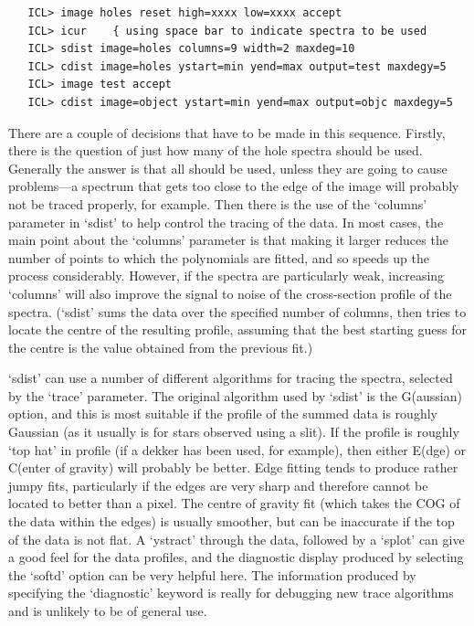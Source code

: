 \documentclass[11pt,twoside]{article}
\newcommand{\latorhtm}[2]{#1}
\newcommand{\latorhtm}[2]{#2}
\begin{document}
\begin{verbatim}
   ICL> image holes reset high=xxxx low=xxxx accept
   ICL> icur    { using space bar to indicate spectra to be used
   ICL> sdist image=holes columns=9 width=2 maxdeg=10
   ICL> cdist image=holes ystart=min yend=max output=test maxdegy=5
   ICL> image test accept
   ICL> cdist image=object ystart=min yend=max output=objc maxdegy=5
\end{verbatim}

   There are a couple of decisions that have to be made in this
   sequence. Firstly, there is the question of just how many of the hole
   spectra should be used.  Generally the answer is that all should be
   used, unless they are going to cause problems\latorhtm{---}{-}a spectrum
   that gets
   too close to the edge of the image will probably not be traced
   properly, for example.  Then there is the use of the `columns'
   parameter in `sdist' to help control the tracing of the data. In most
   cases, the main point about the `columns' parameter is that making it
   larger reduces the number of points to which the polynomials are
   fitted, and so speeds up the process considerably.  However, if the
   spectra are particularly weak, increasing `columns' will also improve
   the signal to noise of the cross-section profile of the spectra.
   (`sdist' sums the data over the specified number of columns, then
   tries to locate the centre of the resulting profile, assuming that
   the best starting guess for the centre is the value obtained from the
   previous fit.)

   `sdist' can use a number of different algorithms for tracing the
   spectra, selected by the `trace' parameter.  The original algorithm
   used by `sdist' is the G(aussian) option, and this is most suitable
   if the profile of the summed data is roughly Gaussian (as it usually
   is for stars observed using a slit).  If the profile is roughly `top
   hat' in profile (if a dekker has been used, for example), then either
   E(dge) or C(enter of gravity) will probably be better.  Edge fitting
   tends to produce rather jumpy fits, particularly if the edges are
   very sharp and therefore cannot be located to better than a pixel.
   The centre of gravity fit (which takes the COG of the data within the
   edges) is usually smoother, but can be inaccurate if the top of the
   data is not flat.  A `ystract' through the data, followed by a
   `splot' can give a good feel for the data profiles, and the
   diagnostic display produced by selecting the `softd' option can be
   very helpful here.  The information produced by specifying the
   `diagnostic' keyword is really for debugging new trace algorithms and
   is unlikely to be of general use.
\end{document}
